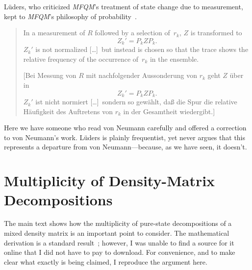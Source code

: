 \documentclass[aps,pra,superscriptaddress,12pt,tightenlines,nofootinbib]{revtex4}
\newcommand{\MFQM}{\textsl{MFQM}}
\begin{document}
L\"uders, who criticized \MFQM's treatment of state change due to
measurement, kept to \MFQM's philosophy of
probability~\cite{Lueders1951}.
\begin{quotation}
\noindent In a measurement of $R$ followed by a selection of~$r_k$,
$Z$ is transformed to
\begin{displaymath}
Z_k' = P_k Z P_k.
\end{displaymath}
$Z_k'$ is not normalized [\ldots\!]\ but instead is chosen so that the
trace shows the relative frequency of the occurrence of~$r_k$ in the
ensemble.

[Bei Messung von $R$ mit nachfolgender Aussonderung von $r_k$ geht $Z$
  \"uber in
\begin{displaymath}
Z_k' = P_k Z P_k.
\end{displaymath}
$Z_k'$ ist nicht normiert [\ldots\!]\ sondern so gew\"ahlt, da\ss{} die
Spur die relative H\"aufigkeit des Auftretens von $r_k$ in der
Gesamtheit wiedergibt.]
\end{quotation}
Here we have someone who read von Neumann carefully and offered a
correction to von Neumann's work.  L\"uders is plainly frequentist,
yet never argues that this represents a departure from von
Neumann---because, as we have seen, it doesn't.


\section{Multiplicity of Density-Matrix Decompositions}

The main text shows how the multiplicity of pure-state decompositions
of a mixed density matrix is an important point to consider.  The
mathematical derivation is a standard result~\cite{Schroedinger1936,
  Hughston1993}; however, I was unable to find a source for it online
that I did not have to pay to download.  For convenience, and to make
clear what exactly is being claimed, I reproduce the argument here.
\end{document}
